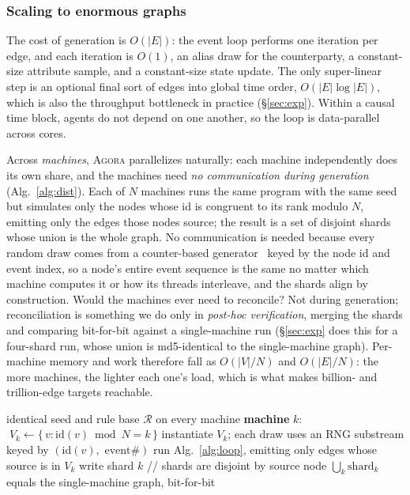 \documentclass[sigconf,review,anonymous]{acmart}
\newcommand{\sys}{\textsc{Agora}\xspace}
\begin{document}
\subsubsection{Scaling to enormous graphs}
\label{sec:scaling}
The cost of generation is $O(|E|)$: the event loop performs one iteration per edge,
and each iteration is $O(1)$, an alias draw for the counterparty, a constant-size
attribute sample, and a constant-size state update. The only super-linear step is
an optional final sort of edges into global time order, $O(|E|\log|E|)$, which is
also the throughput bottleneck in practice (\S\ref{sec:exp}). Within a causal time
block, agents do not depend on one another, so the loop is data-parallel across
cores.

Across \emph{machines}, \sys{} parallelizes naturally: each machine independently does
its own share, and the machines need \emph{no communication during generation}
(Alg.~\ref{alg:dist}). Each of $N$ machines runs the same program with the same seed
but simulates only the nodes whose id is congruent to its rank modulo $N$, emitting
only the edges those nodes source; the result is a set of disjoint shards whose union
is the whole graph. No communication is needed because every random draw comes from a
counter-based generator~\cite{salmon2011random123} keyed by the node id and event
index, so a node's entire event sequence is the same no matter which machine computes
it or how its threads interleave, and the shards align by construction. Would the
machines ever need to reconcile? Not during generation; reconciliation is something we
do only in \emph{post-hoc verification}, merging the shards and comparing bit-for-bit
against a single-machine run (\S\ref{sec:exp} does this for a four-shard run, whose
union is md5-identical to the single-machine graph). Per-machine memory and work
therefore fall as $O(|V|/N)$ and $O(|E|/N)$: the more machines, the lighter each one's
load, which is what makes billion- and trillion-edge targets reachable.

\begin{algorithm}[t]
\caption{Distributed generation on $N$ machines (no coordination)}
\label{alg:dist}
\small
\begin{algorithmic}[1]
\REQUIRE identical seed and rule base $\mathcal{R}$ on every machine
\STATE \textbf{machine} $k$: $\;V_k \gets \{\,v : \mathrm{id}(v)\bmod N = k\,\}$
\STATE instantiate $V_k$; each draw uses an RNG substream keyed by $(\mathrm{id}(v),\text{ event\#})$
\STATE run Alg.~\ref{alg:loop}, emitting only edges whose source is in $V_k$
\STATE write shard $k$ \hfill// shards are disjoint by source node
\ENSURE $\textstyle\bigcup_k \text{shard}_k$ equals the single-machine graph, bit-for-bit
\end{algorithmic}
\end{algorithm}
\end{document}
